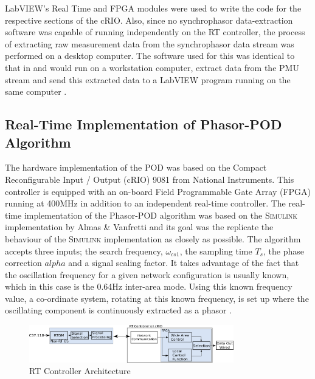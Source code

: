 \documentclass[journal]{IEEEtran}
\begin{document}
LabVIEW's Real Time and FPGA modules were used to write the code for the respective sections of the cRIO. Also,  since no synchrophasor data-extraction software was capable of running independently on the RT controller, the process of extracting raw measurement data from the synchrophasor data stream was performed on a desktop computer. The software used for this was identical to that in \cite{SDK} and would run on a workstation computer, extract data from the PMU stream and send this extracted data to a LabVIEW program running on the same computer \cite{SDK}. \\

\subsection{Real-Time Implementation of Phasor-POD Algorithm}

The hardware implementation of the POD was based on the Compact Reconfigurable Input / Output (cRIO) 9081 \cite{cRIO9081} from National Instruments. This controller is equipped with an on-board Field Programmable Gate Array (FPGA) running at 400MHz in addition to an independent real-time controller. The real-time implementation of the Phasor-POD algorithm was based on the \textsc{Simulink} implementation by Almas \& Vanfretti \cite{PhasorPODImplement} and its goal was the replicate the behaviour of the \textsc{Simulink} implementation as closely as possible. The algorithm accepts three inputs; the search frequency, $\omega_{cs1}$, the sampling time $T_{s}$, the phase correction $alpha$ and a signal scaling factor. It takes advantage of the fact that the oscillation frequency for a given network configuration is usually known, which in this case is the 0.64Hz inter-area mode. Using this known frequency value, a  co-ordinate system, rotating at this known frequency, is set up where the oscillating component is continuously extracted as a phasor \cite{PhasorPOD}.\\
\begin{figure}[!t]
\centering
\includegraphics[width=3.5in]{Final_RT_Arch.png} 
\caption{RT Controller Architecture} %
\label{RTArchitecture}
\end{figure}
\end{document}
